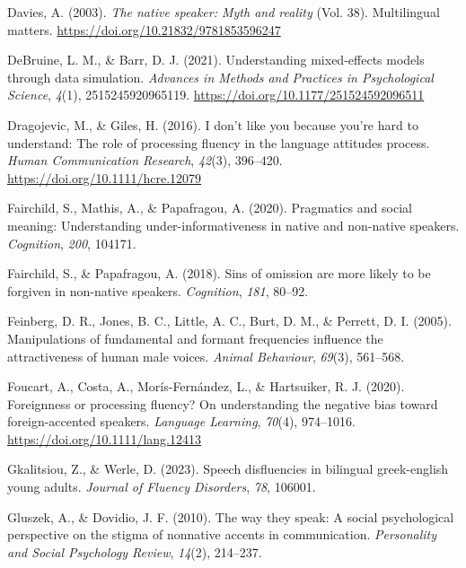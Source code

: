 \documentclass[
  man,floatsintext]{apa6}
\newlength{\cslhangindent}
\newlength{\cslentryspacingunit} %
\newenvironment{CSLReferences}[2] %
 {%
  \setlength{\parindent}{0pt}
  \ifodd #1
  \let\oldpar\par
  \def\par{\hangindent=\cslhangindent\oldpar}
  \fi
  \setlength{\parskip}{#2\cslentryspacingunit}
 }%
 {}
\begin{document}
\begin{CSLReferences}{1}{0}
\leavevmode{}%
Davies, A. (2003). \emph{The native speaker: Myth and reality} (Vol. 38). Multilingual matters. \url{https://doi.org/10.21832/9781853596247}

\leavevmode{}%
DeBruine, L. M., \& Barr, D. J. (2021). Understanding mixed-effects models through data simulation. \emph{Advances in Methods and Practices in Psychological Science}, \emph{4}(1), 2515245920965119. \url{https://doi.org/10.1177/251524592096511}

\leavevmode{}%
Dragojevic, M., \& Giles, H. (2016). I don't like you because you're hard to understand: The role of processing fluency in the language attitudes process. \emph{Human Communication Research}, \emph{42}(3), 396--420. \url{https://doi.org/10.1111/hcre.12079}

\leavevmode{}%
Fairchild, S., Mathis, A., \& Papafragou, A. (2020). Pragmatics and social meaning: Understanding under-informativeness in native and non-native speakers. \emph{Cognition}, \emph{200}, 104171.

\leavevmode{}%
Fairchild, S., \& Papafragou, A. (2018). Sins of omission are more likely to be forgiven in non-native speakers. \emph{Cognition}, \emph{181}, 80--92.

\leavevmode{}%
Feinberg, D. R., Jones, B. C., Little, A. C., Burt, D. M., \& Perrett, D. I. (2005). Manipulations of fundamental and formant frequencies influence the attractiveness of human male voices. \emph{Animal Behaviour}, \emph{69}(3), 561--568.

\leavevmode{}%
Foucart, A., Costa, A., Morís-Fernández, L., \& Hartsuiker, R. J. (2020). Foreignness or processing {fluency? On} understanding the negative bias toward foreign-accented speakers. \emph{Language Learning}, \emph{70}(4), 974--1016. \url{https://doi.org/10.1111/lang.12413}

\leavevmode{}%
Gkalitsiou, Z., \& Werle, D. (2023). Speech disfluencies in bilingual greek-english young adults. \emph{Journal of Fluency Disorders}, \emph{78}, 106001.

\leavevmode{}%
Gluszek, A., \& Dovidio, J. F. (2010). The way they speak: A social psychological perspective on the stigma of nonnative accents in communication. \emph{Personality and Social Psychology Review}, \emph{14}(2), 214--237.


\end{CSLReferences}
\end{document}
